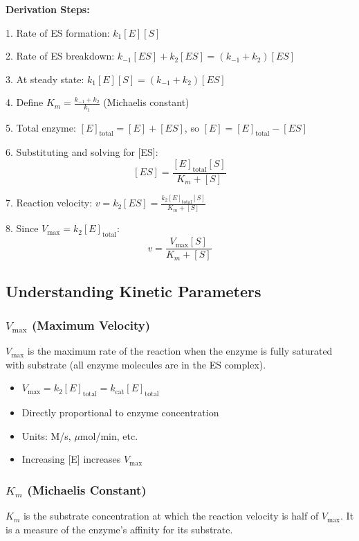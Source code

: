 \textbf{Derivation Steps:}

1. Rate of ES formation: $k_1[E][S]$

2. Rate of ES breakdown: $k_{-1}[ES] + k_2[ES] = (k_{-1} + k_2)[ES]$

3. At steady state: $k_1[E][S] = (k_{-1} + k_2)[ES]$

4. Define $K_m = \frac{k_{-1} + k_2}{k_1}$ (Michaelis constant)

5. Total enzyme: $[E]_{\text{total}} = [E] + [ES]$, so $[E] = [E]_{\text{total}} - [ES]$

6. Substituting and solving for [ES]:
\[
[ES] = \frac{[E]_{\text{total}}[S]}{K_m + [S]}
\]

7. Reaction velocity: $v = k_2[ES] = \frac{k_2[E]_{\text{total}}[S]}{K_m + [S]}$

8. Since $V_{\max} = k_2[E]_{\text{total}}$:
\[
\boxed{v = \frac{V_{\max}[S]}{K_m + [S]}}
\]

\subsection{Understanding Kinetic Parameters}

\subsubsection{$V_{\max}$ (Maximum Velocity)}

\begin{definition}
$V_{\max}$ is the maximum rate of the reaction when the enzyme is fully saturated with substrate (all enzyme molecules are in the ES complex).
\end{definition}

\begin{itemize}
    \item $V_{\max} = k_2[E]_{\text{total}} = k_{\text{cat}}[E]_{\text{total}}$
    \item Directly proportional to enzyme concentration
    \item Units: M/s, $\mu$mol/min, etc.
    \item Increasing [E] increases $V_{\max}$
\end{itemize}

\subsubsection{$K_m$ (Michaelis Constant)}

\begin{definition}
$K_m$ is the substrate concentration at which the reaction velocity is half of $V_{\max}$. It is a measure of the enzyme's affinity for its substrate.
\end{definition}

